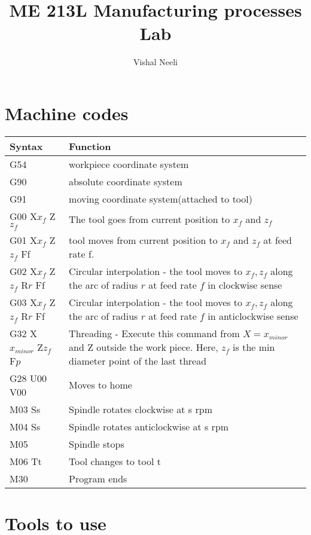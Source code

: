 \documentclass{article}
\title{ME 213L Manufacturing processes Lab}
\author{Vishal Neeli}
\begin{document}
\maketitle

\section{Machine codes}
\begin{tabular}{|m{12em}|m{30em}|}
	\hline
	\textbf{Syntax} & \textbf{Function}\\
	\hline
	\hline
	G54 & workpiece coordinate system\\
	\hline
	G90 & absolute coordinate system\\
	\hline
	G91 & moving coordinate system(attached to tool)\\
	\hline
	G00 X$x_f$ Z$z_f$ & The tool goes from current position to $x_f$ and $z_f$\\
	\hline
	G01 X$x_f$ Z$z_f$ Ff & tool moves from current position to $x_f$ and $z_f$ at feed rate f.\\
	\hline
	G02 X$x_f$ Z$z_f$ R$r$ Ff & Circular interpolation - the tool moves to $x_f,z_f$ along the arc of radius $r$ at feed rate $f$ in clockwise sense\\
	\hline
	G03 X$x_f$ Z$z_f$ R$r$ Ff & Circular interpolation - the tool moves to $x_f,z_f$ along the arc of radius $r$ at feed rate $f$ in anticlockwise sense\\
	\hline
	G32 X$x_{minor}$ Z$z_f$ F$p$ & Threading - Execute this command from $X=x_{minor}$ and Z outside the work piece. Here, $z_f$ is the min diameter point of the last thread\\
	\hline
	G28 U00 V00 & Moves to home \\%
	\hline
	M03 Ss & Spindle rotates clockwise at s rpm\\
	\hline
	M04 Ss & Spindle rotates anticlockwise at s rpm\\
	\hline
	M05 & Spindle stops\\
	\hline
	M06 Tt & Tool changes to tool t\\
	\hline
	M30 & Program ends\\
	\hline
	
\end{tabular}


\section{Tools to use}
\end{document}
